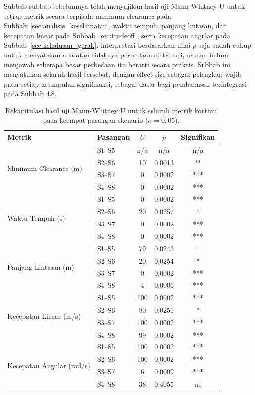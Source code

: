 Subbab-subbab sebelumnya telah menyajikan hasil uji Mann-Whitney U untuk
setiap metrik secara terpisah: minimum clearance pada
Subbab~\ref{sec:analisis_keselamatan}, waktu tempuh, panjang lintasan, dan
kecepatan linear pada Subbab~\ref{sec:tradeoff}, serta kecepatan angular
pada Subbab~\ref{sec:kehalusan_gerak}. Interpretasi berdasarkan nilai $p$
saja sudah cukup untuk menyatakan ada atau tidaknya perbedaan distribusi,
namun belum menjawab seberapa besar perbedaan itu berarti secara praktis.
Subbab ini menyatukan seluruh hasil tersebut, dengan effect size sebagai
pelengkap wajib pada setiap kesimpulan signifikansi, sebagai dasar bagi
pembahasan terintegrasi pada Subbab 4.8.

\begin{table}[H]
\centering
\caption{Rekapitulasi hasil uji Mann-Whitney U untuk seluruh metrik kontinu
pada keempat pasangan skenario ($\alpha=0,05$).}
\label{tab:rekap_mwu}
\begin{tabular}{llccc}
\toprule
\textbf{Metrik} & \textbf{Pasangan} & \textbf{$U$} & \textbf{$p$} & \textbf{Signifikan} \\
\midrule
\multirow{4}{*}{Minimum Clearance (m)}
 & S1--S5 & n/a & n/a    & n/a \\
 & S2--S6 & 10  & 0,0013 & **  \\
 & S3--S7 & 0   & 0,0002 & *** \\
 & S4--S8 & 0   & 0,0002 & *** \\
\midrule
\multirow{4}{*}{Waktu Tempuh (s)}
 & S1--S5 & 0  & 0,0002 & *** \\
 & S2--S6 & 20 & 0,0257 & *  \\
 & S3--S7 & 0  & 0,0002 & *** \\
 & S4--S8 & 0  & 0,0002 & *** \\
\midrule
\multirow{4}{*}{Panjang Lintasan (m)}
 & S1--S5 & 79 & 0,0243 & *  \\
 & S2--S6 & 20 & 0,0254 & *  \\
 & S3--S7 & 0  & 0,0002 & *** \\
 & S4--S8 & 4  & 0,0006 & *** \\
\midrule
\multirow{4}{*}{Kecepatan Linear (m/s)}
 & S1--S5 & 100 & 0,0002 & *** \\
 & S2--S6 & 80  & 0,0251 & *  \\
 & S3--S7 & 100 & 0,0002 & *** \\
 & S4--S8 & 99  & 0,0002 & *** \\
\midrule
\multirow{4}{*}{Kecepatan Angular (rad/s)}
 & S1--S5 & 100 & 0,0002 & *** \\
 & S2--S6 & 100 & 0,0002 & *** \\
 & S3--S7 & 6   & 0,0009 & *** \\
 & S4--S8 & 38  & 0,4055 & ns  \\
\bottomrule
\end{tabular}
\end{table}

